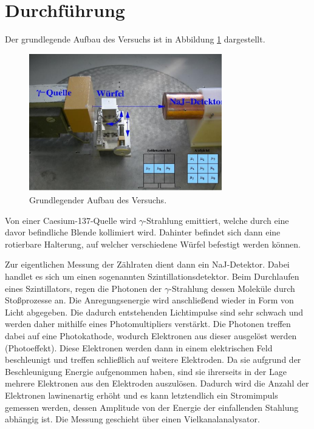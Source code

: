 \section{Durchführung}
\label{sec:Durchführung}

Der grundlegende Aufbau des Versuchs ist in Abbildung \ref{fig:aufbau} dargestellt.

\begin{figure}[H]
  \centering
  \includegraphics[height=6cm]{Aufbau.PNG}
  \caption{Grundlegender Aufbau des Versuchs. \cite{sample}}
  \label{fig:aufbau}
\end{figure}

Von einer Caesium-137-Quelle wird $\gamma$-Strahlung emittiert, welche durch eine
davor befindliche Blende kollimiert wird. Dahinter befindet sich dann eine rotierbare
Halterung, auf welcher verschiedene Würfel befestigt werden können.

Zur eigentlichen Messung der Zählraten dient dann ein NaJ-Detektor.
Dabei handlet es sich um einen sogenannten Szintillationsdetektor.
Beim Durchlaufen eines Szintillators, regen die Photonen der $\gamma$-Strahlung dessen
Moleküle durch Stoßprozesse an. Die Anregungsenergie wird anschließend wieder in Form
von Licht abgegeben. Die dadurch entstehenden Lichtimpulse sind sehr schwach und
werden daher mithilfe eines Photomultipliers verstärkt. Die Photonen treffen dabei
auf eine Photokathode, wodurch Elektronen aus dieser ausgelöst werden (Photoeffekt).
Diese Elektronen werden dann in einem elektrischen Feld beschleunigt und treffen
schließlich auf weitere Elektroden. Da sie aufgrund der Beschleunigung Energie
aufgenommen haben, sind sie ihrerseits in der Lage mehrere
Elektronen aus den Elektroden auszulösen. Dadurch wird die Anzahl der Elektronen lawinenartig erhöht
und es kann letztendlich ein Stromimpuls gemessen werden, dessen Amplitude von der
Energie der einfallenden Stahlung abhängig ist. Die Messung geschieht über einen Vielkanalanalysator.

